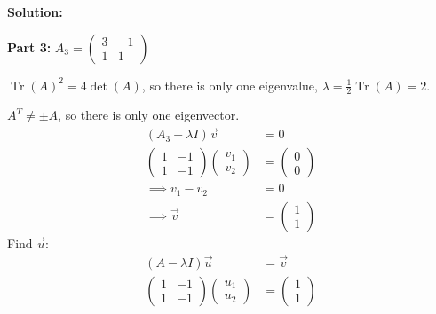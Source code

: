 \documentclass[12pt]{article}
\DeclareMathOperator{\Tr}{Tr}
\newenvironment{solution}{
    \textbf{Solution:}
    
}{
    
    \vspace{2em}
}
\begin{document}
\begin{solution}
    
    
    

    \textbf{Part 3:} \(A_3 = \begin{pmatrix}    
        3 & -1 \\
        1 & 1
    \end{pmatrix}\)

    \(\Tr(A)^2 = 4\det(A)\), so there is only one eigenvalue, \(\lambda = \frac{1}{2}\Tr(A) = 2\).

    \(A^T \neq \pm A\), so there is only one eigenvector.
    \[
        \begin{aligned}
            (A_3 - \lambda I)\vec{v} &= 0\\
            \begin{pmatrix}
                1 & -1 \\
                1 & -1
            \end{pmatrix} \begin{pmatrix}
                v_1 \\
                v_2
            \end{pmatrix} &= \begin{pmatrix}
                0 \\
                0
            \end{pmatrix}\\
            \implies v_1 - v_2 &= 0\\
            \implies \vec{v} &= \begin{pmatrix}
                1 \\
                1
            \end{pmatrix}
        \end{aligned}
    \]
    Find \(\vec{u}\):
    \[
        \begin{aligned}
            (A - \lambda I)\vec{u} &= \vec{v}\\
            \begin{pmatrix}
                1 & -1 \\
                1 & -1
            \end{pmatrix} \begin{pmatrix}
                u_1 \\
                u_2
            \end{pmatrix} &= \begin{pmatrix}
                1 \\
                1
            \end{pmatrix}\\

\end{aligned}\]
\end{solution}
\end{document}
